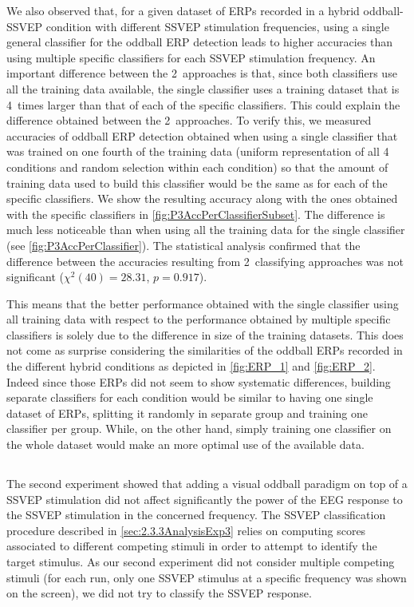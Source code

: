 \documentclass[10pt]{article}
\begin{document}
    We also observed that, for a given dataset of ERPs recorded in a hybrid oddball-SSVEP condition with different SSVEP stimulation frequencies, using a single general classifier for the oddball ERP detection leads to higher accuracies than using multiple specific classifiers for each SSVEP stimulation frequency.
    An important difference between the 2~approaches is that, since both classifiers use all the training data available, the single classifier uses a training dataset that is 4~times larger than that of each of the specific classifiers.
    This could explain the difference obtained between the 2~approaches.
    To verify this, we measured accuracies of oddball ERP detection obtained when using a single classifier that was trained on one fourth of the training data (uniform representation of all 4 conditions and random selection within each condition) so that the amount of training data used to build this classifier would be the same as for each of the specific classifiers.
    We show the resulting accuracy along with the ones obtained with the specific classifiers in \autoref{fig:P3AccPerClassifierSubset}.
    The difference is much less noticeable than when using all the training data for the single classifier (see \autoref{fig:P3AccPerClassifier}).
    The statistical analysis confirmed that the difference between the accuracies resulting from 2~classifying approaches was not significant ($\chi^2(40)=28.31$, $p=0.917$).

    This means that the better performance obtained with the single classifier using all training data with respect to the performance obtained by multiple specific classifiers is solely due to the difference in size of the training datasets.
    This does not come as surprise considering the similarities of the oddball ERPs recorded in the different hybrid conditions as depicted in \autoref{fig:ERP_1} and \autoref{fig:ERP_2}.
    Indeed since those ERPs did not seem to show systematic differences, building separate classifiers for each condition would be similar to having one single dataset of ERPs, splitting it randomly in separate group and training one classifier per group.
    While, on the other hand, simply training one classifier on the whole dataset would make an more optimal use of the available data.

    \subsection{}
    \label{sec:4Discuss2}
    The second experiment showed that adding a visual oddball paradigm on top of a SSVEP stimulation did not affect significantly the power of the EEG response to the SSVEP stimulation in the concerned frequency.
    The SSVEP classification procedure described in \autoref{sec:2.3.3AnalysisExp3} relies on computing scores associated to different competing stimuli in order to attempt to identify the target stimulus.
    As our second experiment did not consider multiple competing stimuli (for each run, only one SSVEP stimulus at a specific frequency was shown on the screen), we did not try to classify the SSVEP response.
\end{document}
